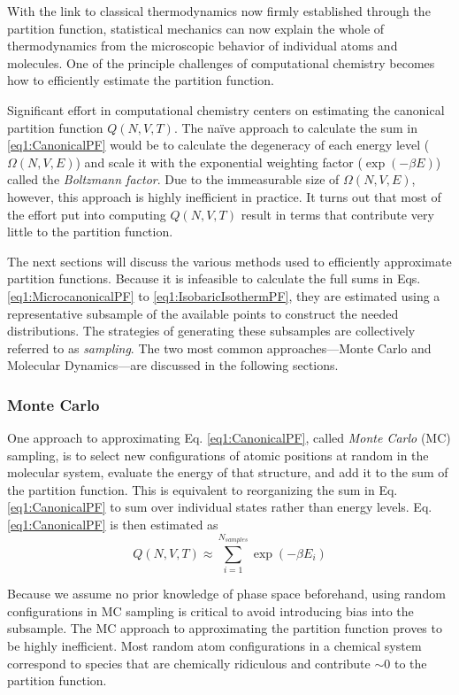 With the link to classical thermodynamics now firmly established through the
partition function, statistical mechanics can now explain the whole of
thermodynamics from the microscopic behavior of individual atoms and molecules.
One of the principle challenges of computational chemistry becomes how to
efficiently estimate the partition function.

Significant effort in computational chemistry centers on estimating the
canonical partition function $Q(N, V, T)$. The na\"ive approach to calculate the
sum in \ref{eq1:CanonicalPF} would be to calculate the degeneracy of each energy
level ($\Omega(N, V, E)$) and scale it with the exponential weighting factor
($\exp(-\beta E)$) called the \emph{Boltzmann factor}. Due to the immeasurable
size of $\Omega(N, V, E)$, however, this approach is highly inefficient in
practice. It turns out that most of the effort put into computing $Q(N, V, T)$
result in terms that contribute very little to the partition function.

The next sections will discuss the various methods used to efficiently
approximate partition functions. Because it is infeasible to calculate the full
sums in Eqs. \ref{eq1:MicrocanonicalPF} to \ref{eq1:IsobaricIsothermPF}, they
are estimated using a representative subsample of the available points to
construct the needed distributions. The strategies of generating these
subsamples are collectively referred to as \emph{sampling}. The two most common
approaches---Monte Carlo and Molecular Dynamics---are discussed in the following
sections.

\subsubsection{Monte Carlo}

One approach to approximating Eq. \ref{eq1:CanonicalPF}, called \emph{Monte
Carlo} (MC) sampling, is to select new configurations of atomic positions at
random in the molecular system, evaluate the energy of that structure, and add
it to the sum of the partition function. This is equivalent to reorganizing the
sum in Eq. \ref{eq1:CanonicalPF} to sum over individual states rather than
energy levels. Eq. \ref{eq1:CanonicalPF} is then estimated as
\begin{equation}
   Q(N, V, T) \approx \sum_{i=1}^{N_{samples}} \exp(-\beta E_i)
   \label{eq1:MonteCarloCanonicalPF}
\end{equation}

Because we assume no prior knowledge of phase space beforehand, using random
configurations in MC sampling is critical to avoid introducing bias into the
subsample. The MC approach to approximating the partition function proves to be
highly inefficient. Most random atom configurations in a chemical system
correspond to species that are chemically ridiculous and contribute $\sim 0$ to
the partition function.

